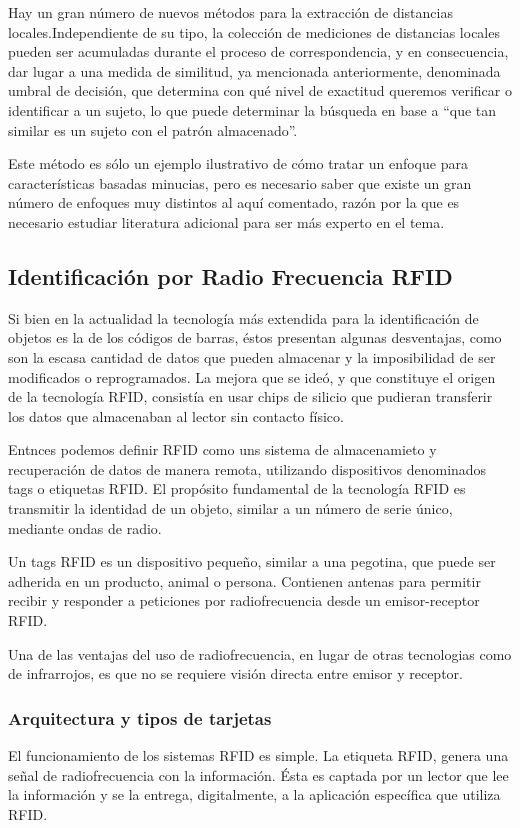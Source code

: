 Hay un gran número de nuevos métodos para la extracción de distancias locales.Independiente de su tipo, la colección de mediciones de distancias locales pueden ser acumuladas durante el proceso de correspondencia, y en consecuencia, dar lugar a una medida de similitud, ya mencionada anteriormente, denominada umbral de decisión, que determina con qué nivel de exactitud queremos verificar o identificar a un sujeto, lo que puede determinar la búsqueda en base a “que tan similar es un sujeto con el patrón almacenado”.


Este método es sólo un ejemplo ilustrativo de cómo tratar un enfoque para características basadas minucias, pero es necesario saber que existe un gran número de enfoques muy distintos al aquí comentado, razón por la que es necesario estudiar literatura adicional para ser más experto en el tema.


\subsection{Identificación por Radio Frecuencia RFID}

Si bien en la actualidad la tecnología más extendida para la identificación de objetos es la de los códigos de barras, éstos presentan algunas desventajas, como son la escasa cantidad de datos que pueden almacenar y la
imposibilidad de ser modificados o reprogramados. La mejora que se ideó, y que constituye el origen de la tecnología RFID, consistía en usar chips de silicio que pudieran transferir los datos que almacenaban al lector sin contacto físico.

Entnces podemos definir RFID como  uns  sistema de  almacenamieto  y  recuperación  de  datos  de  manera remota, utilizando dispositivos denominados tags o etiquetas RFID. El propósito fundamental de la tecnología RFID es transmitir la identidad de un objeto, similar a un número de serie único, mediante ondas de radio.

Un tags RFID es un dispositivo pequeño, similar a una  pegotina, que puede ser adherida en un producto, animal o persona. Contienen antenas para permitir recibir y responder a peticiones por radiofrecuencia desde un emisor-receptor RFID.


Una de las ventajas del uso de radiofrecuencia, en lugar de otras tecnologias como de infrarrojos, es que no se requiere visión directa entre emisor y receptor.

\subsubsection{Arquitectura y tipos de tarjetas}


El funcionamiento de los sistemas RFID es simple. La etiqueta RFID,  genera una señal de radiofrecuencia con la información. Ésta es captada por un lector que lee la información y se la entrega, digitalmente, a la aplicación específica que utiliza RFID.





